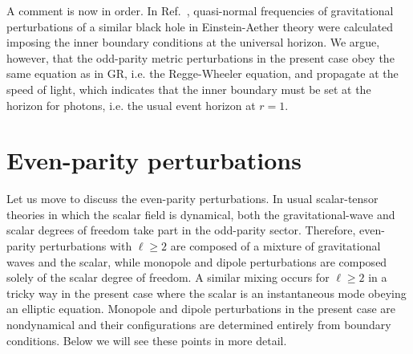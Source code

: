 \documentclass[aps,prd,preprintnumbers,superscriptaddress,nofootinbib,notitlepage]{revtex4-2}
\begin{document}
A comment is now in order. 
In Ref.~\cite{Zhang:2022fbz}, quasi-normal frequencies of gravitational perturbations of a similar black hole in Einstein-Aether theory were calculated imposing the inner boundary conditions at the universal horizon. We argue, however, that the odd-parity metric perturbations in the present case obey the same equation as in GR, i.e. the Regge-Wheeler equation, and propagate at the speed of light,
which indicates that the inner boundary must be set at the horizon for photons, i.e. the usual event horizon at $r=1$.




\section{Even-parity perturbations}\label{even-parity}

Let us move to discuss the even-parity perturbations.
In usual scalar-tensor theories in which the scalar field is dynamical, both the gravitational-wave and scalar degrees of freedom take part in the odd-parity sector.
Therefore, even-parity perturbations with $\ell\ge 2$ are composed of a mixture of gravitational waves and the scalar, while monopole and dipole perturbations are composed solely of the scalar degree of freedom.
A similar mixing occurs for $\ell\ge 2$ in a tricky way in the present case where the scalar is an instantaneous mode obeying an elliptic equation.
Monopole and dipole perturbations in the present case are nondynamical and their configurations are determined entirely from boundary conditions.
Below we will see these points in more detail.
\end{document}
